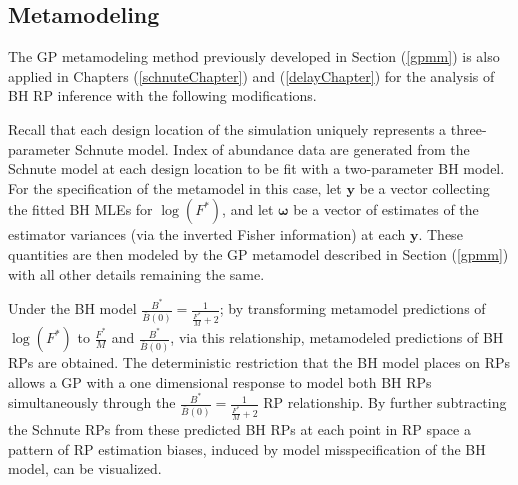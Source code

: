{\color{blue}
\subsection{Metamodeling}

%
The GP metamodeling method previously developed in Section (\ref{gpmm}) is 
also applied in Chapters (\ref{schnuteChapter}) and (\ref{delayChapter}) for the 
analysis of BH RP inference with the following modifications.

Recall that each design location of the simulation uniquely represents a three-parameter 
Schnute model. Index of abundance data are generated from the Schnute model 
at each design location to be fit with a two-parameter BH model.
For the specification of the metamodel in this case, let $\textbf{y}$ 
be a vector collecting the fitted BH MLEs for $\log(F^*)$, and let
$\bm{\omega}$ be a vector of estimates of the estimator variances (via the
inverted Fisher information) at each $\textbf{y}$. These quantities are then 
modeled by the GP metamodel described in Section (\ref{gpmm}) with all other details 
remaining the same.

Under the BH model $\frac{B^*}{\bar B(0)}=\frac{1}{\frac{F^*}{M}+2}$; by transforming metamodel
predictions of $\log(F^*)$ to $\frac{F^*}{M}$ and $\frac{B^*}{\bar B(0)}$, via this relationship, 
metamodeled predictions of BH RPs are obtained. The deterministic restriction that the BH model 
places on RPs allows a GP with a one dimensional response to model both BH RPs simultaneously 
through the $\frac{B^*}{\bar B(0)}=\frac{1}{\frac{F^*}{M}+2}$ RP relationship.
By further subtracting the Schnute RPs from these predicted BH RPs
at each point in RP space a pattern of RP estimation biases, induced by model 
misspecification of the BH model, can be visualized. %
}

